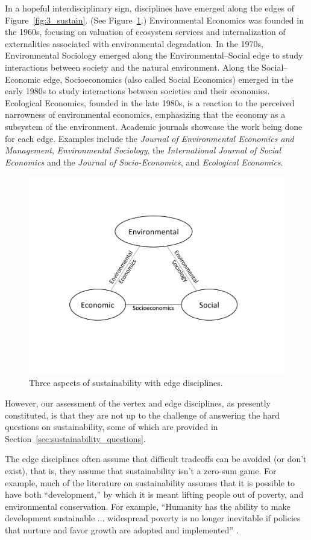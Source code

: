 \documentclass[12pt]{article}
\begin{document}
In a hopeful interdisciplinary sign, 
disciplines have emerged along the edges of Figure~\ref{fig:3_sustain}.
(See Figure~\ref{fig:3_sustain_with_edge_disciplines}.)
Environmental Economics was founded in the 1960s,
focusing on valuation of ecosystem services and 
internalization of externalities associated with environmental degradation.
In the 1970s, Environmental Sociology emerged along the Environmental--Social edge 
to study interactions between society and the natural environment. 
Along the Social--Economic edge, Socioeconomics (also called Social Economics) 
emerged in the early 1980s
to study interactions between societies and their economies.
Ecological Economics, founded in the late 1980s, 
is a reaction to the perceived narrowness of environmental economics, 
emphasizing that the economy as a subsystem of the environment.
Academic journals showcase the work being done for each edge.
Examples include
the \emph{Journal of Environmental Economics and Management}, 
\emph{Environmental Sociology}, 
the \emph{International Journal of Social Economics} and the \emph{Journal of Socio-Economics}, and
\emph{Ecological Economics}.

\begin{figure}
\centering
\includegraphics[width=0.75\linewidth]{figure_other/TriangleDiagramWithDisciplines.pdf}
\caption{Three aspects of sustainability with edge disciplines.}
\label{fig:3_sustain_with_edge_disciplines}
\end{figure}

However, our assessment of the vertex and edge disciplines,
as presently constituted,
is that they are not up to the challenge of answering the hard questions on sustainability,
some of which are provided in Section~\ref{sec:sustainability_questions}.

The edge disciplines often assume that difficult tradeoffs can be avoided (or don't exist), 
that is, they assume that sustainability isn't a zero-sum game. 
For example, 
much of the literature on sustainability 
assumes that it is possible to have both ``development,'' 
by which it is meant lifting people out of poverty,
and environmental conservation. 
For example, ``Humanity has the ability to make development sustainable ... widespread poverty is no
longer inevitable if policies that nurture and favor growth are adopted and implemented'' \cite{Ngome2015}.
\end{document}
